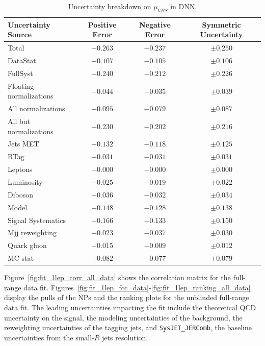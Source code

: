 \begin{table}[h]
\centering
\begin{tabular}{|l|c|c|c|}
\hline
Uncertainty Source & Positive Error & Negative Error & Symmetric Uncertainty \\
\hline
Total                    & \(+0.263\) & \(-0.237\) & \(\pm 0.250\) \\
DataStat                 & \(+0.107\) & \(-0.105\) & \(\pm 0.106\) \\
FullSyst                 & \(+0.240\) & \(-0.212\) & \(\pm 0.226\) \\
\hline
Floating normalizations  & \(+0.044\) & \(-0.035\) & \(\pm 0.039\) \\
All normalizations       & \(+0.095\) & \(-0.079\) & \(\pm 0.087\) \\
All but normalizations   & \(+0.230\) & \(-0.202\) & \(\pm 0.216\) \\
Jets MET                 & \(+0.132\) & \(-0.118\) & \(\pm 0.125\) \\
BTag                     & \(+0.031\) & \(-0.031\) & \(\pm 0.031\) \\
Leptons                  & \(+0.000\) & \(-0.000\) & \(\pm 0.000\) \\
Luminosity               & \(+0.025\) & \(-0.019\) & \(\pm 0.022\) \\
Diboson                  & \(+0.036\) & \(-0.032\) & \(\pm 0.034\) \\
Model                    & \(+0.148\) & \(-0.128\) & \(\pm 0.138\) \\
Signal Systematics       & \(+0.166\) & \(-0.133\) & \(\pm 0.150\) \\
Mjj reweighting          & \(+0.023\) & \(-0.037\) & \(\pm 0.030\) \\
Quark gluon              & \(+0.015\) & \(-0.009\) & \(\pm 0.012\) \\
MC stat                  & \(+0.082\) & \(-0.077\) & \(\pm 0.079\) \\
\hline
\end{tabular}
\caption{Uncertainty breakdown on $\mu_{VBS}$ in \olep DNN.}
\label{tab:break_1lepdnn}
\end{table}




Figure~\ref{fig:fit_1lep_corr_all_data} shows the correlation matrix for the full-range data fit. 
Figures~\ref{fig:fit_1lep_fcc_data}-\ref{fig:fit_1lep_ranking_all_data} display the pulls of the NPs and the ranking plots for the unblinded full-range data fit. 
The leading uncertainties impacting the fit include the theoretical QCD uncertainty on the signal, the modeling uncertainties of the \Wjets background, the reweighting uncertainties of the tagging jets, and \texttt{SysJET\_JERComb}, the baseline uncertainties from the small-$R$ jets resolution.

